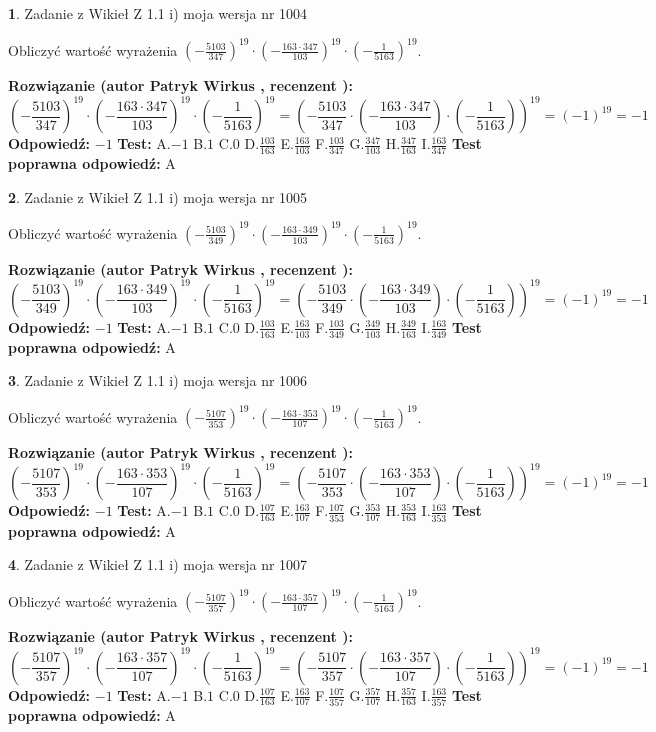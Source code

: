 \documentclass[12pt, a4paper]{article}
\theoremstyle{definition} %
\newtheorem{zad}{}
\newcommand{\zadStart}[1]{\begin{zad}#1\newline}
\newcommand{\zadStop}{\end{zad}}
\newcommand{\rozwStart}[2]{\noindent \textbf{Rozwiązanie (autor #1 , recenzent #2): }\newline}
\newcommand{\rozwStop}{\newline}
\newcommand{\odpStart}{\noindent \textbf{Odpowiedź:}\newline}
\newcommand{\odpStop}{\newline}
\newcommand{\testStart}{\noindent \textbf{Test:}\newline}
\newcommand{\testStop}{\newline}
\newcommand{\kluczStart}{\noindent \textbf{Test poprawna odpowiedź:}\newline}
\newcommand{\kluczStop}{\newline}
\begin{document}
\zadStart{Zadanie z Wikieł Z 1.1 i) moja wersja nr 1004}

Obliczyć wartość wyrażenia $(-\frac{5103}{347})^{19} \cdot (-\frac{163 \cdot 347}{103})^{19} \cdot (-\frac{1}{5163})^{19}$.
\zadStop
\rozwStart{Patryk Wirkus}{}
$$(-\frac{5103}{347})^{19} \cdot (-\frac{163 \cdot 347}{103})^{19} \cdot (-\frac{1}{5163})^{19} = (-\frac{5103}{347} \cdot (-\frac{163 \cdot 347}{103}) \cdot (-\frac{1}{5163}))^{19} = (-1)^{19} = -1$$
\rozwStop
\odpStart
$-1$
\odpStop
\testStart
A.$-1$ B.$1$ C.$0$ D.$\frac{103}{163}$ E.$\frac{163}{103}$
F.$\frac{103}{347}$ G.$\frac{347}{103}$
H.$\frac{347}{163}$
I.$\frac{163}{347}$
\testStop
\kluczStart
A
\kluczStop



\zadStart{Zadanie z Wikieł Z 1.1 i) moja wersja nr 1005}

Obliczyć wartość wyrażenia $(-\frac{5103}{349})^{19} \cdot (-\frac{163 \cdot 349}{103})^{19} \cdot (-\frac{1}{5163})^{19}$.
\zadStop
\rozwStart{Patryk Wirkus}{}
$$(-\frac{5103}{349})^{19} \cdot (-\frac{163 \cdot 349}{103})^{19} \cdot (-\frac{1}{5163})^{19} = (-\frac{5103}{349} \cdot (-\frac{163 \cdot 349}{103}) \cdot (-\frac{1}{5163}))^{19} = (-1)^{19} = -1$$
\rozwStop
\odpStart
$-1$
\odpStop
\testStart
A.$-1$ B.$1$ C.$0$ D.$\frac{103}{163}$ E.$\frac{163}{103}$
F.$\frac{103}{349}$ G.$\frac{349}{103}$
H.$\frac{349}{163}$
I.$\frac{163}{349}$
\testStop
\kluczStart
A
\kluczStop



\zadStart{Zadanie z Wikieł Z 1.1 i) moja wersja nr 1006}

Obliczyć wartość wyrażenia $(-\frac{5107}{353})^{19} \cdot (-\frac{163 \cdot 353}{107})^{19} \cdot (-\frac{1}{5163})^{19}$.
\zadStop
\rozwStart{Patryk Wirkus}{}
$$(-\frac{5107}{353})^{19} \cdot (-\frac{163 \cdot 353}{107})^{19} \cdot (-\frac{1}{5163})^{19} = (-\frac{5107}{353} \cdot (-\frac{163 \cdot 353}{107}) \cdot (-\frac{1}{5163}))^{19} = (-1)^{19} = -1$$
\rozwStop
\odpStart
$-1$
\odpStop
\testStart
A.$-1$ B.$1$ C.$0$ D.$\frac{107}{163}$ E.$\frac{163}{107}$
F.$\frac{107}{353}$ G.$\frac{353}{107}$
H.$\frac{353}{163}$
I.$\frac{163}{353}$
\testStop
\kluczStart
A
\kluczStop



\zadStart{Zadanie z Wikieł Z 1.1 i) moja wersja nr 1007}

Obliczyć wartość wyrażenia $(-\frac{5107}{357})^{19} \cdot (-\frac{163 \cdot 357}{107})^{19} \cdot (-\frac{1}{5163})^{19}$.
\zadStop
\rozwStart{Patryk Wirkus}{}
$$(-\frac{5107}{357})^{19} \cdot (-\frac{163 \cdot 357}{107})^{19} \cdot (-\frac{1}{5163})^{19} = (-\frac{5107}{357} \cdot (-\frac{163 \cdot 357}{107}) \cdot (-\frac{1}{5163}))^{19} = (-1)^{19} = -1$$
\rozwStop
\odpStart
$-1$
\odpStop
\testStart
A.$-1$ B.$1$ C.$0$ D.$\frac{107}{163}$ E.$\frac{163}{107}$
F.$\frac{107}{357}$ G.$\frac{357}{107}$
H.$\frac{357}{163}$
I.$\frac{163}{357}$
\testStop
\kluczStart
A
\kluczStop
\end{document}
